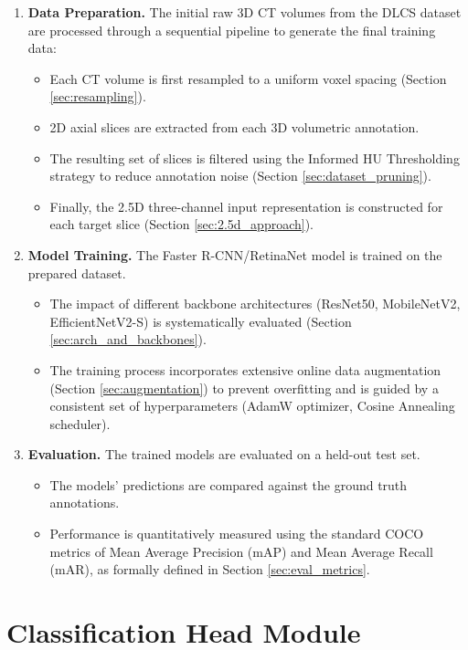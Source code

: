 \begin{enumerate}
    \item \textbf{Data Preparation.} The initial raw 3D CT volumes from the DLCS dataset are processed through a sequential pipeline to generate the final training data:
    \begin{itemize}
        \item Each CT volume is first resampled to a uniform voxel spacing (Section \ref{sec:resampling}).
        \item 2D axial slices are extracted from each 3D volumetric annotation.
        \item The resulting set of slices is filtered using the Informed HU Thresholding strategy to reduce annotation noise (Section \ref{sec:dataset_pruning}).
        \item Finally, the 2.5D three-channel input representation is constructed for each target slice (Section \ref{sec:2.5d_approach}).
    \end{itemize}

    \item \textbf{Model Training.} The Faster R-CNN/RetinaNet model is trained on the prepared dataset. 
    \begin{itemize}
        \item The impact of different backbone architectures (ResNet50, MobileNetV2, EfficientNetV2-S) is systematically evaluated (Section \ref{sec:arch_and_backbones}).
        \item The training process incorporates extensive online data augmentation (Section \ref{sec:augmentation}) to prevent overfitting and is guided by a consistent set of hyperparameters (AdamW optimizer, Cosine Annealing scheduler).
    \end{itemize}

    \item \textbf{Evaluation.} The trained models are evaluated on a held-out test set. 
    \begin{itemize}
        \item The models' predictions are compared against the ground truth annotations.
        \item Performance is quantitatively measured using the standard COCO metrics of Mean Average Precision (mAP) and Mean Average Recall (mAR), as formally defined in Section \ref{sec:eval_metrics}.
    \end{itemize}
\end{enumerate}


\section{Classification Head Module}

